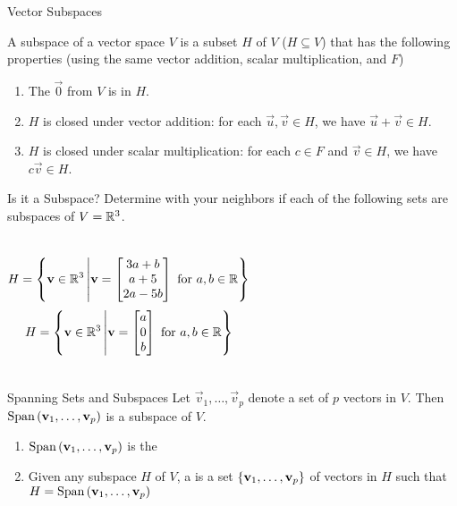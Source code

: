 \documentclass[xcoler=dvipsnames, aspectratio=169]{beamer}
\begin{document}
    \begin{frame}{Vector Subspaces}
        \begin{defn}
            A subspace of a vector space $V$ is a subset $H$ of $V$ ($H\subseteq V$) that has the following
            properties (using the same vector addition, scalar multiplication, and $F$)
            \begin{enumerate}
                \pause\item The $\vec{0}$ from $V$ is in $H$.
                \pause\item $H$ is closed under vector addition: for each $\vec{u},\vec{v}\in H$, we have
                    $\vec{u} + \vec{v}\in H$.
                \pause\item $H$ is closed under scalar multiplication: for each $c\in F$
                    and $\vec{v}\in H$, we have $c\vec{v}\in  H$.
            \end{enumerate}
        \end{defn}
    \end{frame}
    \begin{frame}{Is it a Subspace?}
        Determine with your neighbors if each of the following sets are subspaces of
        $V=\mathbb{R}^3$.
        \begin{columns}
            \[
                H = \left\{\mathbf{v}\in\mathbb{R}^3\left|\mathbf{v} = \begin{bmatrix}
                    3a+b\\
                    a+5\\
                    2a-5b
                \end{bmatrix}\textnormal{ for }a,b\in\mathbb{R}\right\}\right.
            \]
            \[
                H = \left\{\mathbf{v}\in\mathbb{R}^3\left|\mathbf{v} = \begin{bmatrix}
                    a\\0\\b
                \end{bmatrix}\textnormal{ for }a,b\in\mathbb{R}\right\}\right.
            \]
        \end{columns}
        \vspace{130pt}
    \end{frame}
    \begin{frame}{Spanning Sets and Subspaces}
        Let $\vec{v}_1,\dots,\vec{v}_p$ denote a set of $p$ vectors in $V$. Then
        $\text{Span}\left(\mathbf{v}_1,\dots,\mathbf{v}_p\right)$ is a subspace of $V$.
        \begin{enumerate}
            \pause\item $\text{Span}\left(\mathbf{v}_1,\dots,\mathbf{v}_p\right)$ is the 
            \pause\item Given any subspace $H$ of $V$, a  is a set
                $\left\{\mathbf{v}_1,\dots,\mathbf{v}_p\right\}$ of vectors in $H$ such that
                $H = \text{Span}\left(\mathbf{v}_1,\dots,\mathbf{v}_p\right)$
        \end{enumerate}
    \end{frame}
\end{document}
